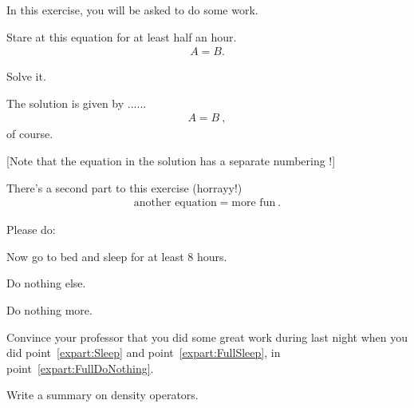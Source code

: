 \documentclass[11pt,a4paper]{article}
\begin{document}
\MakeUebungHeader


In this exercise, you will be asked to do some work.


\begin{exenumerate}
\item Stare at this equation for at least half an hour.
  \begin{align}
    A = B.
  \end{align}

\item Solve it.

  \begin{loesung}
    The solution is given by ...... 
    \begin{align}
      A=B\ ,
    \end{align}
    of course.

    [Note that the equation in the solution has a separate numbering !]
  \end{loesung}
\end{exenumerate}

There's a second part to this exercise (horrayy!)
\begin{align}
  \text{another equation} = \text{more fun}\ .
\end{align}


\begin{exenumerate} %
\item {}
  Please do:
  \begin{exenumerate}
  \item \label{expart:Sleep}
    Now go to bed and sleep for at least 8 hours.
  \item {}
    Do nothing else.
  \item Do nothing more.
  \end{exenumerate}

\item Convince your professor that you did some great work during last night when you did
  point~\ref{expart:Sleep} and point~\ref{expart:FullSleep}, in
  point~\ref{expart:FullDoNothing}.

\item Write a summary on density operators.

\end{exenumerate}
\end{document}
